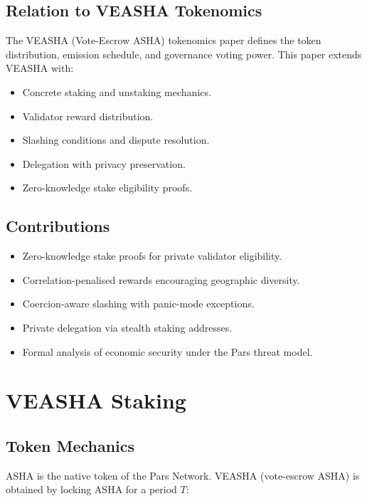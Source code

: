\documentclass[11pt,a4paper]{article}
\begin{document}
\subsection{Relation to VEASHA Tokenomics}

The VEASHA (Vote-Escrow ASHA) tokenomics paper defines the token
distribution, emission schedule, and governance voting power.  This
paper extends VEASHA with:

\begin{itemize}
    \item Concrete staking and unstaking mechanics.
    \item Validator reward distribution.
    \item Slashing conditions and dispute resolution.
    \item Delegation with privacy preservation.
    \item Zero-knowledge stake eligibility proofs.
\end{itemize}

\subsection{Contributions}

\begin{itemize}
    \item Zero-knowledge stake proofs for private validator eligibility.
    \item Correlation-penalised rewards encouraging geographic diversity.
    \item Coercion-aware slashing with panic-mode exceptions.
    \item Private delegation via stealth staking addresses.
    \item Formal analysis of economic security under the Pars threat model.
\end{itemize}

\section{VEASHA Staking}
\label{sec:veasha}

\subsection{Token Mechanics}

ASHA is the native token of the Pars Network.  VEASHA (vote-escrow ASHA)
is obtained by locking ASHA for a period $T$:
\end{document}
